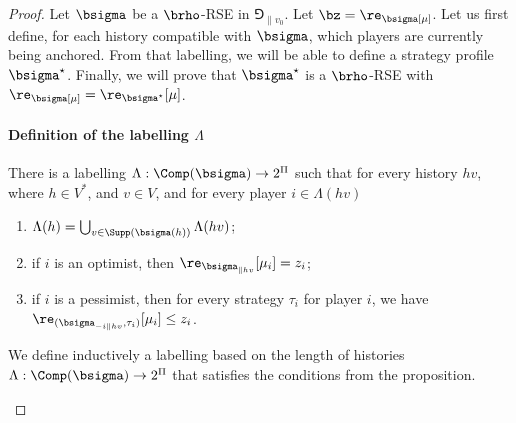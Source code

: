 \begin{proof}

    Let $\bsigma$ be a $\brho$-RSE in $\Game_{\|v_0}$.
    Let $\bz = \re_\bsigma[\mu]$.
    Let us first define, for each history compatible with $\bsigma$, which players are currently being anchored.
    From that labelling, we will be able to define a strategy profile $\bsigma^\star$.
    Finally, we will prove that $\bsigma^\star$ is a $\brho$-RSE with $\re_\bsigma[\mu] = \re_{\bsigma^\star}[\mu]$.

\paragraph*{Definition of the labelling $\Lambda$}
    \begin{proposition}
        There is a labelling $\Lambda: \Comp(\bsigma) \to 2^\Pi$ such that for every history $hv$, where $h\in V^*$, and $v\in V$, and for every player $i\in \Lambda(hv)$ 
        \begin{enumerate}
        \item $\Lambda(h) = \bigcup_{v \in \Supp (\bsigma(h))} \Lambda(hv)$;~\label{itm:partitionanchor}
        \item if $i$ is an optimist, then  $\re_{\bsigma_{\|hv}}[\mu_i] = z_i$;~\label{itm:optimistanchor}

        \item if $i$ is a pessimist, then for every strategy $\tau_i$ for player $i$, we have $\re_{(\bsigma_{-i\|hv}, \tau_i)}[\mu_i] \leq z_i$.~\label{itm:pessimistanchor}
    \end{enumerate}
    \end{proposition}
    \begin{claimproof}
        We define inductively a labelling based on the length of histories $\Lambda: \Comp(\bsigma) \to 2^\Pi$ that satisfies the conditions from the proposition. 

    

\end{claimproof}
\end{proof}
